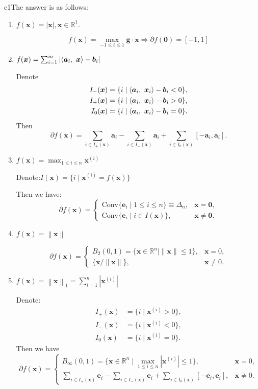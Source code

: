 \documentclass{article}
\newcommand{\aB}{\bm{a}}
\newcommand{\bB}{\bm{b}}
\newcommand{\xB}{\bm{x}}
\newcommand{\gB}{\bm{g}}
\newcommand{\RBB}{\mathbb{R}}
\newcommand{\normgen}[1]{\left\| #1 \right\|}
\newcommand{\normone}[1]{\left\| #1 \right\|_1}
\begin{document}
\begin{SOLUTION}{e1}The answer is as follows:

	\begin{enumerate}
		\item $f(\xB) = |\xB|, \xB \in \RBB^1$.
		
		\begin{equation}
			f(\xB) = \max_{-1\leq t \leq 1} \gB \cdot \xB \Rightarrow \partial f(\bm{0}) = [-1, 1]
		\end{equation}

		\item $f(\xB) = \sum_{i=1}^{m} | \innerproduct{\aB_i}{\xB} - \bB_i|$
		
			Denote
			\[
				\begin{aligned}
					I_-(\xB) &= \{ i \mid \innerproduct{\aB_i}{\xB_i} - \bB_i < 0 \},\\
					I_+(\xB) &= \{ i \mid \innerproduct{\aB_i}{\xB_i} - \bB_i > 0 \},\\
					I_0(\xB) &= \{ i \mid \innerproduct{\aB_i}{\xB_i} - \bB_i = 0 \}.
				\end{aligned}	
			\]
			Then 
			\[
				\partial f(\xB)	= \sum_{i \in I_+(\xB)} \bm{a}_i - \sum_{i \in I_-(\xB)} \bm{a}_i + \sum_{i \in I_0(\xB)} [-\bm{a}_i, \bm{a}_i].
			\]
		\item $f(\xB) = \max_{1 \leq i \leq n} \xB^{(i)}$
		
			Denote:$I(\xB) = \{ i \mid \xB^{(i)} = f(\xB) \}$
			
			Then we have:
			\[
				\partial f(\xB) = \begin{cases}
					\mathrm{Conv} \{ \bm{e}_i \mid 1 \le i \le n \} \equiv \Delta_n, & \xB = \bm{0},\\
					\mathrm{Conv} \{ \bm{e}_i \mid i \in I(\xB) \}, & \xB \ne \bm{0}.	
				\end{cases}
			\]
		\item $f(\xB) = \normgen{\xB}$
		
			\[
				\partial f(\xB)	= \begin{cases}
					B_2(0, 1) = \{ \xB \in \RBB^n \mid \|\xB\| \le 1 \}, &\xB = 0,\\
					\{\xB / \|\xB\|\}, &\xB \ne 0.
				\end{cases}
			\]
		\item $f(\xB) = \normone{\xB} = \sum_{i=1}^{n} |\xB^{(i)}|$
			
		Denote:
			\[
				\begin{aligned}
					I_+(\xB) &= \{ i \mid \xB^{(i)} > 0 \},\\
					I_-(\xB) &= \{ i \mid \xB^{(i)} < 0 \},\\
					I_0(\xB) &= \{ i \mid \xB^{(i)} = 0 \}.
				\end{aligned}	
			\]
			Then we have
			\[
				\partial f(\xB)	= \begin{cases}
					B_\infty(0, 1) = \{ \xB \in \RBB^n \mid \max_{1 \le i \le n} |\xB^{(i)}| \le 1 \}, &\xB = 0,\\
					\sum_{i \in I_+(\xB)} \bm{e}_i - \sum_{i \in I_-(\xB)} \bm{e}_i + \sum_{i \in I_0(\xB)} [-\bm{e}_i, \bm{e}_i], &\xB \ne 0.
				\end{cases}
			\]
	\end{enumerate}


\end{SOLUTION}
\end{document}
